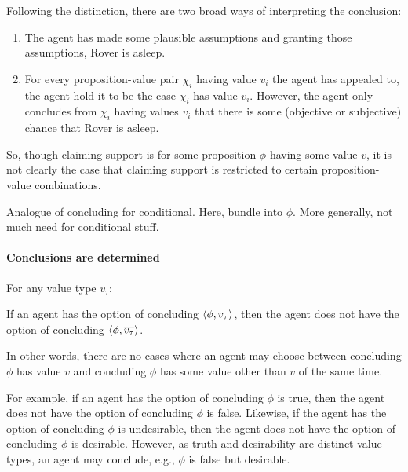 \begin{note}[Suppositions]
  Following the distinction, there are two broad ways of interpreting the conclusion:
  \begin{enumerate}
  \item
    The agent has made some plausible assumptions and granting those assumptions, Rover is asleep.
  \item
    For every proposition-value pair \(\chi_{i}\) having value \(v_{i}\) the agent has appealed to, the agent hold it to be the case \(\chi_{i}\) has value \(v_{i}\).
    However, the agent only concludes from \(\chi_{i}\) having values \(v_{i}\) that there is some (objective or subjective) chance that Rover is asleep.
  \end{enumerate}
  So, though claiming support is for some proposition \(\phi\) having some value \(v\), it is not clearly the case that claiming support is restricted to certain proposition-value combinations.
\end{note}

\begin{note}[Analogue]
  Analogue of concluding for conditional.
  Here, bundle into \(\phi\).
  More generally, not much need for conditional stuff.
\end{note}

\paragraph*{Conclusions are determined}

\begin{note}
  \begin{assumption}
    \label{assu:conc:determined}
    For any value type \(v_{\tau}\):

    If an agent has the option of concluding \(\langle \phi, v_{\tau} \rangle\), then the agent does not have the option of concluding \(\langle \phi, \overline{v_{\tau}} \rangle\).
  \end{assumption}

  In other words, there are no cases where an agent may choose between concluding \(\phi\) has value \(v\) and concluding \(\phi\) has some value other than \(v\) of the same time.

  For example, if an agent has the option of concluding \(\phi\) is true, then the agent does not have the option of concluding \(\phi\) is false.
  Likewise, if the agent has the option of concluding \(\phi\) is undesirable, then the agent does not have the option of concluding \(\phi\) is desirable.
  However, as truth and desirability are distinct value types, an agent may conclude, e.g., \(\phi\) is false but desirable.
\end{note}

